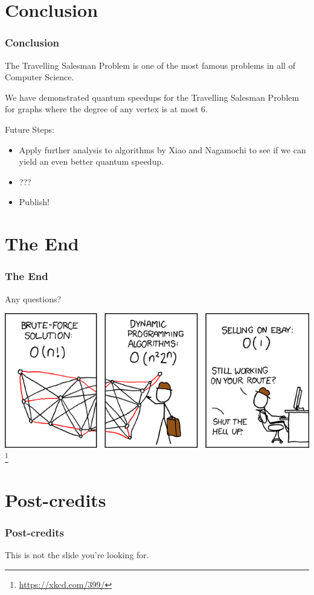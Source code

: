 \documentclass[]{beamer}
\begin{document}
\section{Conclusion}

\begin{frame}
\frametitle{Conclusion}
The Travelling Salesman Problem is one of the most famous problems in all of Computer Science.

We have demonstrated quantum speedups for the Travelling Salesman Problem for graphs where the degree of any vertex is at most $6$.

Future Steps:
\begin{itemize}
\item Apply further analysis to algorithms by Xiao and Nagamochi to see if we can yield an even better quantum speedup.
\item ???
\item Publish!
\end{itemize}
\end{frame}

\section{The End}

\begin{frame}
\frametitle{The End}
\begin{center}
Any questions?

\includegraphics[scale=0.5]{xkcd}\footnote{\url{https://xkcd.com/399/}}
\end{center}
\end{frame}

\section{Post-credits}

\begin{frame}
\frametitle{Post-credits}
\centerline{This is not the slide you're looking for.}
\end{frame}

\end{document}
